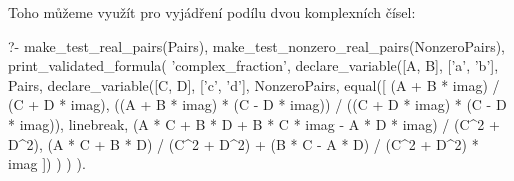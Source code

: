 Toho můžeme využít pro vyjádření podílu dvou komplexních čísel:

\begin{prolog}
?-	make_test_real_pairs(Pairs),
	make_test_nonzero_real_pairs(NonzeroPairs),
	print_validated_formula(
		'complex_fraction',
		declare_variable([A, B], ['a', 'b'], Pairs,
			declare_variable([C, D], ['c', 'd'], NonzeroPairs,
				equal([
					(A + B * imag) / (C + D * imag),
					((A + B * imag) * (C - D * imag)) / ((C + D * imag) * (C - D * imag)),
					linebreak,
					(A * C + B * D + B * C * imag - A * D * imag) / (C^2 + D^2),
					(A * C + B * D) / (C^2 + D^2) + (B * C - A * D) / (C^2 + D^2) * imag
				])
			)
		)
	).
\end{prolog}
